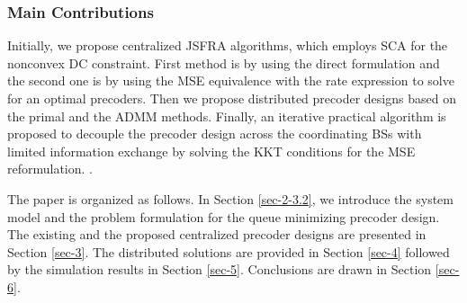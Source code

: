 \subsubsection*{Main Contributions}
 Initially, we propose centralized \ac{JSFRA} algorithms, which employs \ac{SCA} for the nonconvex \ac{DC} constraint. First method is by using the direct formulation and the second one is by using the \ac{MSE} equivalence with the rate expression to solve for an optimal precoders. Then we propose distributed precoder designs based on the primal and the \ac{ADMM} methods. Finally, an iterative practical algorithm is proposed to decouple the precoder design across the coordinating \acp{BS} with limited information exchange by solving the \ac{KKT} conditions for the \ac{MSE} reformulation. .

The paper is organized as follows. In Section \ref{sec-2-3.2}, we introduce the system model and the problem formulation for the queue minimizing precoder design. The existing and the proposed centralized precoder designs are presented in Section \ref{sec-3}. The distributed solutions are provided in Section \ref{sec-4} followed by the simulation results in Section \ref{sec-5}. Conclusions are drawn in Section \ref{sec-6}.